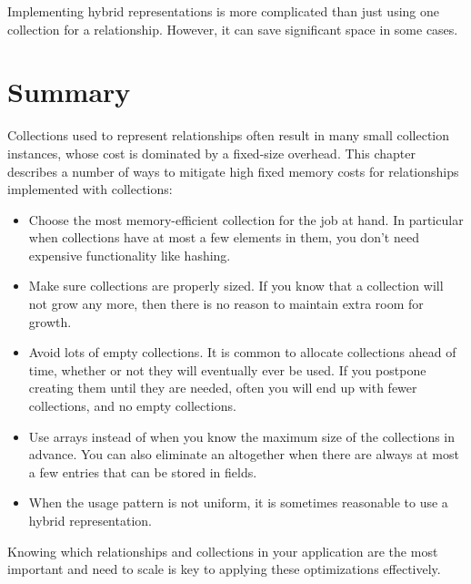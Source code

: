 Implementing hybrid representations is more complicated than just using one
collection for a relationship. However, it can save significant space in some
cases.

\section{Summary}

Collections used to represent relationships often result in many small
collection instances, whose cost is dominated by a fixed-size
overhead. This chapter describes a number of ways to mitigate high fixed memory
costs for relationships implemented with collections:
\begin{itemize}
  \item Choose the most memory-efficient collection for the job at hand. In
  particular when collections have at most a few elements in them, you don't
  need expensive functionality like hashing. 
  \item Make sure collections are properly sized. If you know that a collection
  will not grow any more, then there is no reason to maintain extra room for
  growth.
  \item Avoid lots of empty collections. It is common to allocate collections 
 ahead of time, whether or not they will eventually ever be used. If you
 postpone creating them until they are needed, often you will end up with fewer collections, 
 and no empty collections.
 \item Use arrays instead of  when you know the maximum size
 of the collections in advance. You can also eliminate an
  altogether when there are always at most a few entries that
 can be stored in fields.
 \item When the usage pattern is not uniform, it is sometimes reasonable to use
 a hybrid representation.
\end{itemize}
Knowing which relationships and collections in your application are the most
important and need to scale is key to applying these optimizations effectively.  




